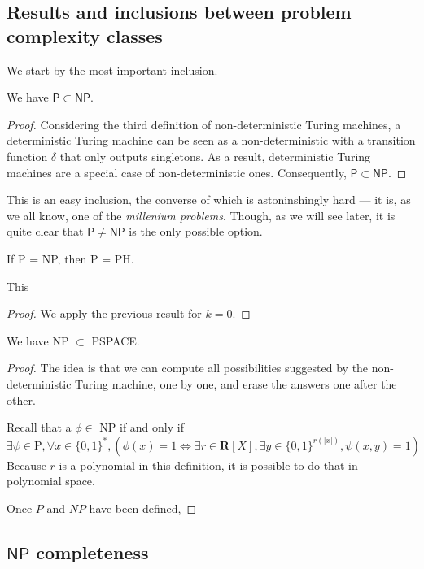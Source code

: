\subsection{Results and inclusions between problem complexity classes}

We start by the most important inclusion.

\begin{proposition}
    We have $ \mathsf P \subset \mathsf{NP} $.
\end{proposition}

\begin{proof}
    Considering the third definition of non-deterministic Turing machines, a deterministic Turing machine can be seen as a non-deterministic with a transition function $ \delta $ that only outputs singletons. As a result, deterministic Turing machines are a special case of non-deterministic ones. Consequently, $ \mathsf P \subset \mathsf{NP} $.
\end{proof}

This is an easy inclusion, the converse of which is astoninshingly hard --- it is, as we all know, one of the \textit{millenium problems}. Though, as we will see later, it is quite clear that $ \mathsf P \neq \mathsf{NP} $ is the only possible option.



\begin{corollary}
    If P = NP, then P = PH.
\end{corollary}

This  

\begin{proof}
    We apply the previous result for $ k = 0 $.
\end{proof}

\begin{proposition}
    We have NP $ \subset $ PSPACE.
\end{proposition}

\begin{proof}
    The idea is that we can compute all possibilities suggested by the non-deterministic Turing machine, one by one, and erase the answers one after the other.

    Recall that a $ \phi \in $ NP if and only if
    \[
        \exists \psi \in \mathrm P, \forall x \in \{ 0,1 \}^*, ( \phi(x) = 1 \iff \exists r \in \mathbf R[X], \exists y \in \{ 0,1 \}^{r(|x|)}, \psi(x,y) = 1)
    \]
    Because $ r $ is a polynomial in this definition, it is possible to do that in polynomial space.


Once $P$ and $NP$ have been defined,
\end{proof}

\subsection{$ \mathsf{NP} $ completeness}

\begin{theorem}
    
\end{theorem}

\begin{definition}

\end{definition}

